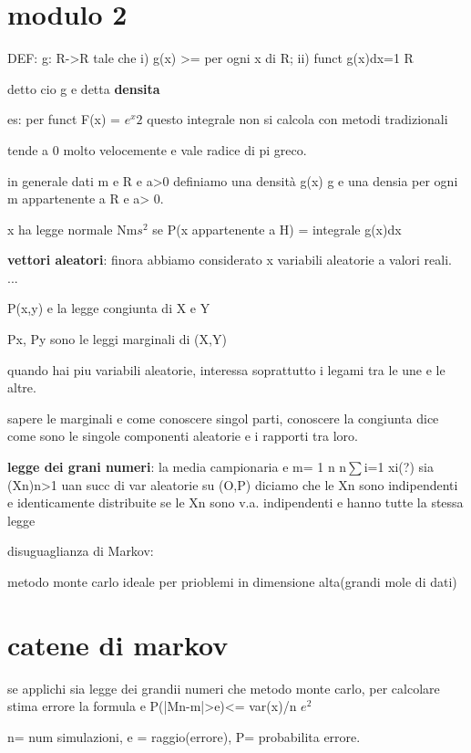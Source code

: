\documentclass[12pt]{article}
\begin{document}
\section{modulo 2}


DEF: 
g: R->R tale che
i) g(x) >= per ogni x di R;
ii) funct g(x)dx=1
R

detto cio g e detta \textbf{densita}

es: per funct F(x) = $e^x2$ questo integrale non si calcola con metodi tradizionali

tende a 0 molto velocemente  e vale radice di pi greco.

in generale dati m e R e a>0 definiamo una densità g(x)
g e una densia per ogni m appartenente a R e a> 0.

x ha legge normale Nm$s^2$ se P(x appartenente a H) = integrale g(x)dx

\textbf{vettori aleatori}: finora abbiamo considerato x variabili aleatorie a valori reali.
...

P(x,y) e la legge congiunta di X e Y

Px, Py sono le leggi marginali di (X,Y)

quando hai piu variabili aleatorie, interessa soprattutto i legami tra le une e le altre.

sapere le marginali e come conoscere singol parti, conoscere la congiunta dice come sono le singole componenti aleatorie e i rapporti tra loro.

\textbf{legge dei grani numeri}:
la media campionaria e m= 1 n n$\sum$i=1 xi(?)
sia (Xn)n>1 uan succ di var aleatorie su (O,P) diciamo che le Xn sono indipendenti e identicamente distribuite se le Xn sono v.a. indipendenti e hanno tutte la stessa legge

disuguaglianza di Markov:

metodo monte carlo ideale per prioblemi in dimensione alta(grandi mole di dati)

\section{catene di markov}


se applichi sia legge dei grandii numeri che metodo monte carlo,
per calcolare stima errore la formula e P(|Mn-m|>e)<= var(x)/n $e^2$

n= num simulazioni, e = raggio(errore), P= probabilita errore.
\end{document}
